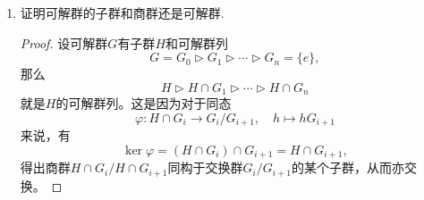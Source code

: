 \begin{enumerate}
\begin{proof}
    下面避开矩阵的表述来重写一遍过程，这在变得更加抽象的同时，也成为了一个完全无需运算的做法。令
    \[\mathbb{C}^3=V_0 \supset V_1 \supset V_2 \supset V_3=\{0\}\]
    为一列子空间的降链，任何两个相邻空间的维数均相差$1$。考察
    \[G_0=\{g\in{\rm GL}(V_0) \mid g(V_1) \subset V_1,\,g(V_2) \subset V_2\}\]
    和同态
    \[\varphi_0:G_0\to{\rm GL}(V_0/V_1)\oplus{\rm GL}(V_1/V_2)\oplus{\rm GL}(V_2/V_3)\cong(\mathbb{C}^*)^3,\]
    $\varphi_0$把$G_0$中的元素$g$映成其在相应的空间上的限制兼商映射，从而
    \[\ker\varphi_0=\{g \in G_0\mid(g-e)(V_0) \subset V_1,\,(g-e)(V_1) \subset V_2,\,(g-e)(V_2) \subset V_3\}.\]
    接下来取$G_1=\ker\varphi_0$，再令同态
    \[\varphi_1:G_1\to{\rm GL}(V_0/V_1,V_1/V_2)\oplus{\rm GL}(V_1/V_2,V_2/V_3)\cong(\mathbb{C}^*)^2\]
    (其中非标准的记号${\rm GL}(V_i/V_{i+1},V_j/V_{j+1})$是指在对同构的线性空间
    \[V_i/V_{i+1} \cong V_j/V_{j+1} \cong \mathbb{C}\]
    三者不加区分时形成的$1$维一般线性群${\rm GL}(\mathbb{C})\cong\mathbb{C}^*$)，
    $\varphi_1$把$G_1$中的元素$g$映成其在相应的空间上的限制兼商映射，从而
    \[\ker\varphi_1=\{g \in G_1\mid(g-e)(V_0) \subset V_2,\,(g-e)(V_1) \subset V_3\}.\]
    最后取$G_2=\ker\varphi_1$，可知合成群列$G_0 \triangleright G_1 \triangleright G_2 \triangleright \{e\}$的每个商因子均交换，这是因为
    \[G_0/G_1\cong\operatorname{im}\varphi_0\cong(\mathbb{C}^*)^3,
    \quad G_1/G_2\cong\operatorname{im}\varphi_1\cong(\mathbb{C}^*)^2\]
    以及
    \[G_2\cong{\rm GL}(V_0/V_1,V_2/V_3)\cong\mathbb{C}^*.\qedhere\]
\end{proof}
\item 证明可解群的子群和商群还是可解群.
\begin{proof}
    设可解群$G$有子群$H$和可解群列
    \[G=G_0 \triangleright G_1 \triangleright\cdots\triangleright G_n=\{e\},\]
    那么
    \[H \triangleright H \cap G_1 \triangleright\cdots\triangleright H \cap G_n\]
    就是$H$的可解群列。这是因为对于同态
    \[\varphi:H \cap G_i \to G_i/G_{i+1}, \quad h \mapsto hG_{i+1}\]
    来说，有
    \[\ker\varphi=(H \cap G_i) \cap G_{i+1}=H \cap G_{i+1},\]
    得出商群$H \cap G_i/H \cap G_{i+1}$同构于交换群$G_i/G_{i+1}$的某个子群，从而亦交换。


\end{proof}
\end{enumerate}
